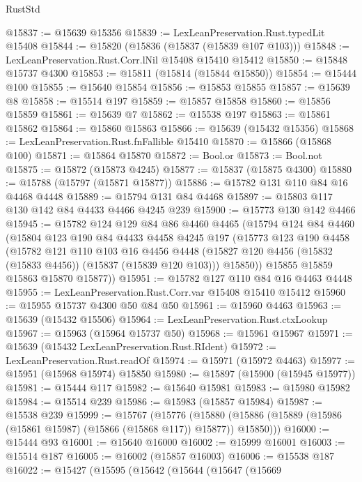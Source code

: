 \begin{lexlean}{RustStd}
\begin{coremodule}
{\begin{coremodule}
{{{{{{{{{{{{{{{{{{{{{{{{{{{{{{{{{{{{{{{{{{{{{{{{{{{{{{{{{{{{@15837 := @15639 @15356
@15839 := LexLeanPreservation.Rust.typedLit @15408
@15844 := @15820 (@15836 (@15837 (@15839 @107 @103)))
@15848 := LexLeanPreservation.Rust.Corr.lNil @15408 @15410 @15412
@15850 := @15848 @15737 @4300
@15853 := @15811 (@15814 (@15844 @15850))
@15854 := @15444 @100
@15855 := @15640 @15854
@15856 := @15853 @15855
@15857 := @15639 @8
@15858 := @15514 @197
@15859 := @15857 @15858
@15860 := @15856 @15859
@15861 := @15639 @7
@15862 := @15538 @197
@15863 := @15861 @15862
@15864 := @15860 @15863
@15866 := @15639 (@15432 @15356)
@15868 := LexLeanPreservation.Rust.fnFallible @15410
@15870 := @15866 (@15868 @100)
@15871 := @15864 @15870
@15872 := Bool.or
@15873 := Bool.not
@15875 := @15872 (@15873 @4245)
@15877 := @15837 (@15875 @4300)
@15880 := @15788 (@15797 (@15871 @15877))
@15886 := @15782 @131 @110 @84 @16 @4468 @4448
@15889 := @15794 @131 @84 @4468
@15897 := @15803 @117 @130 @142 @84 @4433 @4466 @4245 @239
@15900 := @15773 @130 @142 @4466
@15945 := @15782
    @124
    @129
    @84
    @86
    @4460
    @4465
    (@15794
      @124
      @84
      @4460
      (@15804
        @123
        @190
        @84
        @4433
        @4458
        @4245
        @197
        (@15773
          @123
          @190
          @4458
          (@15782
            @121
            @110
            @103
            @16
            @4456
            @4448
            (@15827 @120 @4456 (@15832 (@15833 @4456)) (@15837 (@15839 @120 @103)))
            @15850))
        @15855
        @15859
        @15863
        @15870
        @15877))
@15951 := @15782 @127 @110 @84 @16 @4463 @4448
@15955 := LexLeanPreservation.Rust.Corr.var @15408 @15410 @15412
@15960 := @15955 @15737 @4300 @50 @84 @50
@15961 := @15960 @4463
@15963 := @15639 (@15432 @15506)
@15964 := LexLeanPreservation.Rust.ctxLookup
@15967 := @15963 (@15964 @15737 @50)
@15968 := @15961 @15967
@15971 := @15639 (@15432 LexLeanPreservation.Rust.RIdent)
@15972 := LexLeanPreservation.Rust.readOf
@15974 := @15971 (@15972 @4463)
@15977 := @15951 (@15968 @15974) @15850
@15980 := @15897 (@15900 (@15945 @15977))
@15981 := @15444 @117
@15982 := @15640 @15981
@15983 := @15980 @15982
@15984 := @15514 @239
@15986 := @15983 (@15857 @15984)
@15987 := @15538 @239
@15999 := @15767
    (@15776
      (@15880 (@15886 (@15889 (@15986 (@15861 @15987) (@15866 (@15868 @117)) @15877)) @15850)))
@16000 := @15444 @93
@16001 := @15640 @16000
@16002 := @15999 @16001
@16003 := @15514 @187
@16005 := @16002 (@15857 @16003)
@16006 := @15538 @187
@16022 := @15427
    (@15595
      (@15642
        (@15644
          (@15647
            (@15669
}}}}}}}}}}}}}}}}}}}}}}}}}}}}}}}}}}}}}}}}}}}}}}}}}}}}}}}}}}}}
\end{coremodule}}
\end{coremodule}
\end{lexlean}
